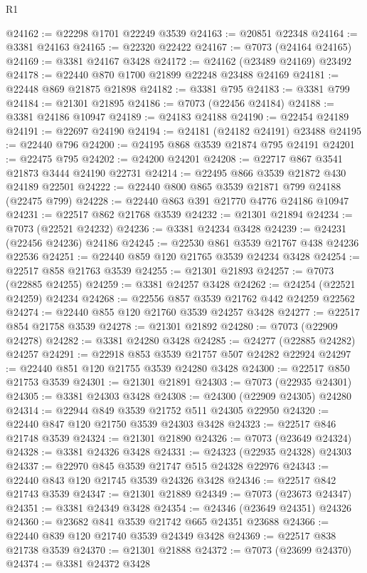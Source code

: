 \begin{lexlean}{R1}
\begin{coremodule}
@24162 := @22298 @1701 @22249 @3539
@24163 := @20851 @22348
@24164 := @3381 @24163
@24165 := @22320 @22422
@24167 := @7073 (@24164 @24165)
@24169 := @3381 @24167 @3428
@24172 := @24162 (@23489 @24169) @23492
@24178 := @22440 @870 @1700 @21899 @22248 @23488 @24169
@24181 := @22448 @869 @21875 @21898
@24182 := @3381 @795
@24183 := @3381 @799
@24184 := @21301 @21895
@24186 := @7073 (@22456 @24184)
@24188 := @3381 @24186 @10947
@24189 := @24183 @24188
@24190 := @22454 @24189
@24191 := @22697 @24190
@24194 := @24181 (@24182 @24191) @23488
@24195 := @22440 @796
@24200 := @24195 @868 @3539 @21874 @795 @24191
@24201 := @22475 @795
@24202 := @24200 @24201
@24208 := @22717 @867 @3541 @21873 @3444 @24190 @22731
@24214 := @22495 @866 @3539 @21872 @430 @24189 @22501
@24222 := @22440 @800 @865 @3539 @21871 @799 @24188 (@22475 @799)
@24228 := @22440 @863 @391 @21770 @4776 @24186 @10947
@24231 := @22517 @862 @21768 @3539
@24232 := @21301 @21894
@24234 := @7073 (@22521 @24232)
@24236 := @3381 @24234 @3428
@24239 := @24231 (@22456 @24236) @24186
@24245 := @22530 @861 @3539 @21767 @438 @24236 @22536
@24251 := @22440 @859 @120 @21765 @3539 @24234 @3428
@24254 := @22517 @858 @21763 @3539
@24255 := @21301 @21893
@24257 := @7073 (@22885 @24255)
@24259 := @3381 @24257 @3428
@24262 := @24254 (@22521 @24259) @24234
@24268 := @22556 @857 @3539 @21762 @442 @24259 @22562
@24274 := @22440 @855 @120 @21760 @3539 @24257 @3428
@24277 := @22517 @854 @21758 @3539
@24278 := @21301 @21892
@24280 := @7073 (@22909 @24278)
@24282 := @3381 @24280 @3428
@24285 := @24277 (@22885 @24282) @24257
@24291 := @22918 @853 @3539 @21757 @507 @24282 @22924
@24297 := @22440 @851 @120 @21755 @3539 @24280 @3428
@24300 := @22517 @850 @21753 @3539
@24301 := @21301 @21891
@24303 := @7073 (@22935 @24301)
@24305 := @3381 @24303 @3428
@24308 := @24300 (@22909 @24305) @24280
@24314 := @22944 @849 @3539 @21752 @511 @24305 @22950
@24320 := @22440 @847 @120 @21750 @3539 @24303 @3428
@24323 := @22517 @846 @21748 @3539
@24324 := @21301 @21890
@24326 := @7073 (@23649 @24324)
@24328 := @3381 @24326 @3428
@24331 := @24323 (@22935 @24328) @24303
@24337 := @22970 @845 @3539 @21747 @515 @24328 @22976
@24343 := @22440 @843 @120 @21745 @3539 @24326 @3428
@24346 := @22517 @842 @21743 @3539
@24347 := @21301 @21889
@24349 := @7073 (@23673 @24347)
@24351 := @3381 @24349 @3428
@24354 := @24346 (@23649 @24351) @24326
@24360 := @23682 @841 @3539 @21742 @665 @24351 @23688
@24366 := @22440 @839 @120 @21740 @3539 @24349 @3428
@24369 := @22517 @838 @21738 @3539
@24370 := @21301 @21888
@24372 := @7073 (@23699 @24370)
@24374 := @3381 @24372 @3428

\end{coremodule}
\end{lexlean}
